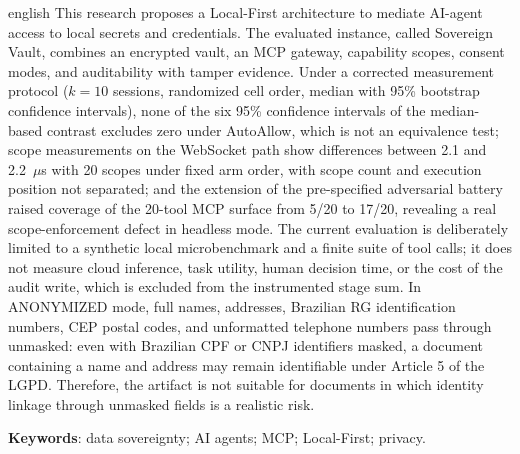 \documentclass[12pt,openright,twoside,a4paper,english,brazil]{abntex2}
\begin{document}
\begin{resumo}[Abstract]
\begin{otherlanguage*}{english}
This research proposes a Local-First architecture to mediate AI-agent access to local secrets and credentials. The evaluated instance, called Sovereign Vault, combines an encrypted vault, an MCP gateway, capability scopes, consent modes, and auditability with tamper evidence. Under a corrected measurement protocol ($k=10$ sessions, randomized cell order, median with 95\% bootstrap confidence intervals), none of the six 95\% confidence intervals of the median-based contrast excludes zero under AutoAllow, which is not an equivalence test; scope measurements on the WebSocket path show differences between 2.1 and 2.2~$\mu$s with 20 scopes under fixed arm order, with scope count and execution position not separated; and the extension of the pre-specified adversarial battery raised coverage of the 20-tool MCP surface from 5/20 to 17/20, revealing a real scope-enforcement defect in headless mode. The current evaluation is deliberately limited to a synthetic local microbenchmark and a finite suite of tool calls; it does not measure cloud inference, task utility, human decision time, or the cost of the audit write, which is excluded from the instrumented stage sum. In ANONYMIZED mode, full names, addresses, Brazilian RG identification numbers, CEP postal codes, and unformatted telephone numbers pass through unmasked: even with Brazilian CPF or CNPJ identifiers masked, a document containing a name and address may remain identifiable under Article 5 of the LGPD. Therefore, the artifact is not suitable for documents in which identity linkage through unmasked fields is a realistic risk.
\end{otherlanguage*}
\textbf{Keywords}: data sovereignty; AI agents; MCP; Local-First; privacy.
\end{resumo}
\listoffigures*
\cleardoublepage
{}
\listoftables*
\cleardoublepage
\end{document}
